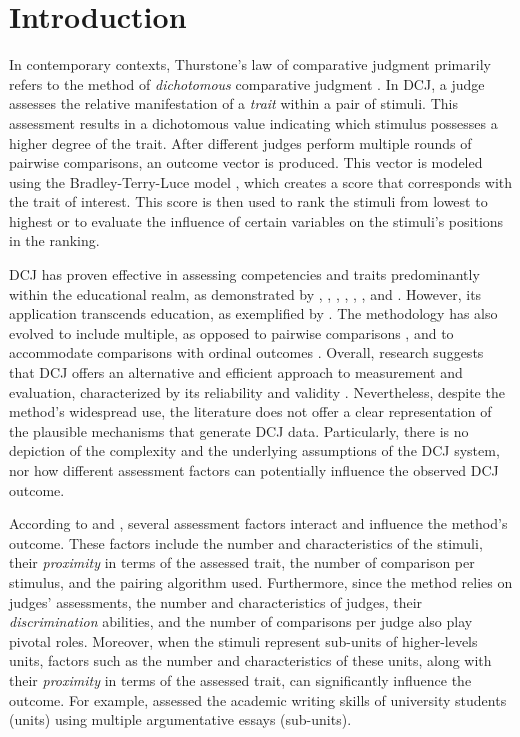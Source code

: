 \documentclass[
  authoryear,
  preprint,
  1p]{elsarticle}
\begin{document}
\section{Introduction}\label{sec-introduction}

In contemporary contexts, Thurstone's law of comparative judgment
\citeyearpar{Thurstone_1927} primarily refers to the method of
\emph{dichotomous} comparative judgment
\citep[DCJ,][]{Pollitt_2012a, Pollitt_2012b}. In DCJ, a judge assesses
the relative manifestation of a \emph{trait} within a pair of stimuli.
This assessment results in a dichotomous value indicating which stimulus
possesses a higher degree of the trait. After different judges perform
multiple rounds of pairwise comparisons, an outcome vector is produced.
This vector is modeled using the Bradley-Terry-Luce model
\citep[BTL,][]{Bradley_et_al_1952, Luce_1959}, which creates a score
that corresponds with the trait of interest. This score is then used to
rank the stimuli from lowest to highest or to evaluate the influence of
certain variables on the stimuli's positions in the ranking.

DCJ has proven effective in assessing competencies and traits
predominantly within the educational realm, as demonstrated by
\citet{Pollitt_2012b}, \citet{Jones_2015}, \citet{vanDaal_et_al_2016},
\citet{Bartholomew_et_al_2018}, \citet{Lesterhuis_2018},
\citet{Bartholomew_et_al_2020}, and \citet{Marshall_et_al_2020}.
However, its application transcends education, as exemplified by
\citet{Boonen_et_al_2020}. The methodology has also evolved to include
multiple, as opposed to pairwise comparisons
\citep{Luce_1959, Placket_1975}, and to accommodate comparisons with
ordinal outcomes \citep{Tutz_1986, Agresti_1992}. Overall, research
suggests that DCJ offers an alternative and efficient approach to
measurement and evaluation, characterized by its reliability and
validity \citep{Lesterhuis_2018, vanDaal_2020, Marshall_et_al_2020}.
Nevertheless, despite the method's widespread use, the literature does
not offer a clear representation of the plausible mechanisms that
generate DCJ data. Particularly, there is no depiction of the complexity
and the underlying assumptions of the DCJ system, nor how different
assessment factors can potentially influence the observed DCJ outcome.

According to \citet{Verhavert_et_al_2019} and \citet{vanDaal_2020},
several assessment factors interact and influence the method's outcome.
These factors include the number and characteristics of the stimuli,
their \emph{proximity} in terms of the assessed trait, the number of
comparison per stimulus, and the pairing algorithm used. Furthermore,
since the method relies on judges' assessments, the number and
characteristics of judges, their \emph{discrimination} abilities, and
the number of comparisons per judge also play pivotal roles. Moreover,
when the stimuli represent sub-units of higher-levels units, factors
such as the number and characteristics of these units, along with their
\emph{proximity} in terms of the assessed trait, can significantly
influence the outcome. For example, \citet{vanDaal_et_al_2016} assessed
the academic writing skills of university students (units) using
multiple argumentative essays (sub-units).
\end{document}
